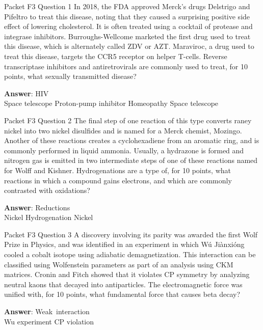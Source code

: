\begin{frame}{Packet F3 Question 1}
In 2018, the FDA approved   Merck’s drugs Delstrigo   and Pifeltro to treat this disease, noting that they caused a surprising positive side effect of lowering cholesterol. It is often treated using a cocktail of protease and integrase inhibitors. Burroughs-Wellcome marketed the first drug used to treat this disease, which is alternately called ZDV or AZT. Maraviroc, a drug used to treat   this disease, targets the CCR5 receptor on helper T-cells.   Reverse transcriptase inhibitors and antiretrovirals are commonly used to treat, for 10 points, what sexually transmitted disease?    

\textbf{Answer}: HIV\\
 Space telescope
 Proton-pump inhibitor
 Homeopathy
 Space telescope
\end{frame}

\begin{frame}{Packet F3 Question 2}
The final step of one reaction of this type converts raney nickel     into two nickel   disulfides and is named for a Merck chemist, Mozingo. Another   of these reactions creates a cyclohexadiene from an aromatic ring, and is commonly performed in liquid ammonia. Usually, a hydrazone is formed and nitrogen gas   is emitted in two intermediate steps of one of these reactions named for Wolff and Kishner. Hydrogenations are a type of, for 10 points, what reactions in which a compound gains electrons, and which are commonly contrasted with oxidations?  

\textbf{Answer}: Reductions\\
 Nickel
 Hydrogenation
 Nickel
\end{frame}

\begin{frame}{Packet F3 Question 3}
A discovery involving its parity was awarded   the first Wolf Prize in Physics, and was identified in an experiment in which Wú Jiànxióng cooled a cobalt isotope using adiabatic demagnetization. This interaction can be classified   using Wolfenstein parameters as part of an analysis using CKM matrices. Cronin   and Fitch showed that it violates CP symmetry by analyzing neutral kaons that   decayed into antiparticles. The electromagnetic force was   unified with, for 10 points, what fundamental force that causes beta decay?  

\textbf{Answer}: Weak\ interaction\\
 Wu experiment
 CP violation
\end{frame}

